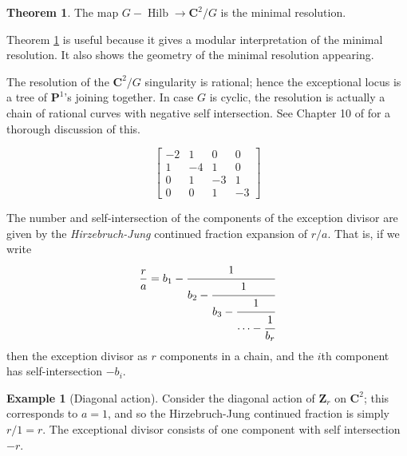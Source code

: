 \documentclass{amsart}[12pt]
\theoremstyle{definition}
\newtheorem{theorem}[dummy]{Theorem}
\newtheorem{example}[dummy]{Example}
\newcommand{\Z}{\mathbf{Z}}
\newcommand{\C}{\mathbf{C}}
\newcommand{\proj}{\mathbf{P}}
\DeclareMathOperator{\Hilb}{Hilb}
\begin{document}
\begin{theorem} \label{thm:GHilb-resolution}
The map $G-\Hilb\to \C^2/G$ is the minimal resolution.
\end{theorem}

Theorem \ref{thm:GHilb-resolution} is useful because it gives a modular interpretation of the minimal resolution.  It also shows the geometry of the minimal resolution appearing.

The resolution of the $\C^2/G$ singularity is rational; hence the exceptional locus is a tree of $\proj^1$'s joining together.  In case $G$ is cyclic, the resolution is actually a chain of rational curves with negative self intersection.  See Chapter 10 of \cite{toric} for a thorough discussion of this.

\begin{center}
\end{center}

$$
\begin{bmatrix}
-2 & 1 & 0 & 0 \\
1 & -4 & 1 & 0 \\
0 & 1 & -3 & 1 \\
0 & 0 & 1 & -3 
\end{bmatrix}
$$

The number and self-intersection of the components of the exception divisor are given by the \emph{Hirzebruch-Jung} continued fraction expansion of $r/a$.  That is, if we write
$$
\frac{r}{a}=b_1-\cfrac{1}{b_2-\cfrac{1}{b_3-\cfrac{1}{\cdots - \cfrac{1}{b_r}}}}
$$  
then the exception divisor as $r$ components in a chain, and the $i$th component has self-intersection $-b_i$. 

\begin{example}[Diagonal action]
Consider the diagonal action of $\Z_r$ on $\C^2$; this corresponds to $a=1$, and so the Hirzebruch-Jung continued fraction is simply $r/1=r$.  The exceptional divisor consists of one component with self intersection $-r$.

\end{example}
\end{document}
